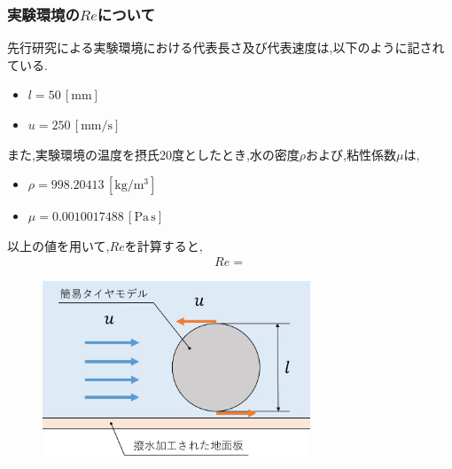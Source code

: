 \documentclass[twocolumn,a4j]{jsarticle}
\begin{document}
\subsubsection{実験環境の$Re$について}
先行研究による実験環境における代表長さ及び代表速度は,以下のように記されている.
\begin{itemize}
    \item $l = 50\,[\mathrm{mm}]$
    \item $u = 250\,[\mathrm{mm/s}]$
\end{itemize}
また,実験環境の温度を摂氏20度としたとき,水の密度$\rho$および,粘性係数$\mu$は,
\begin{itemize}
    \item $\rho = 998.20413\,[\mathrm{kg/m^3}]$
    \item $\mu = 0.0010017488\,[\mathrm{Pa\,s}]$
\end{itemize}
以上の値を用いて,$Re$を計算すると,
\begin{eqnarray}
    Re =
\end{eqnarray}
\begin{figure}[htbp]
    \begin{center}
        \includegraphics[width=80mm]{image_1.jpg}
        \caption{}
    \end{center}
\end{figure}
\end{document}

